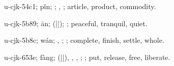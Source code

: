 \begin{multicols}{2}
{\cjkgGlue{}u-cjk-54c1; pǐn; \cjkgGlue{}; \cjkgGlue{}, \cjkgGlue{}; article, product, commodity.

\cjkgGlue{}u-cjk-5b89; ān; \cjkgGlue{}\cjkgGlue{}(\cjkgGlue{}|\cjkgGlue{}|\cjkgGlue{}); \cjkgGlue{}; peaceful, tranquil, quiet.

\cjkgGlue{}u-cjk-5b8c; wán; \cjkgGlue{}, \cjkgGlue{}; \cjkgGlue{}; complete, finish, settle, whole.

\cjkgGlue{}u-cjk-653e; fàng; \cjkgGlue{}\cjkgGlue{}(\cjkgGlue{}|\cjkgGlue{}|\cjkgGlue{}), \cjkgGlue{}\cjkgGlue{}\cjkgGlue{}, \cjkgGlue{}\cjkgGlue{}\cjkgGlue{}, \cjkgGlue{}\cjkgGlue{}\cjkgGlue{}; \cjkgGlue{}; put, release, free, liberate.

}
\end{multicols}
